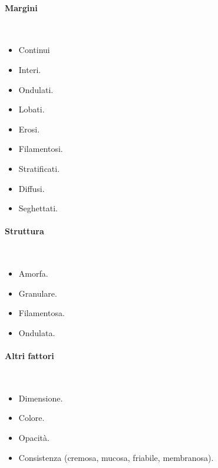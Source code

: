 			\paragraph{Margini}\mbox{}\\
			\begin{multicols}{3}
				\begin{itemize}
					\item Continui
					\item Interi.
					\item Ondulati.
					\item Lobati.
					\item Erosi.
					\item Filamentosi.
					\item Stratificati.
					\item Diffusi.
					\item Seghettati.
				\end{itemize}
			\end{multicols}

			\paragraph{Struttura}\mbox{}\\
			\begin{multicols}{2}
				\begin{itemize}
					\item Amorfa.
					\item Granulare.
					\item Filamentosa.
					\item Ondulata.
				\end{itemize}
			\end{multicols}

			\paragraph{Altri fattori}\mbox{}\\
			\begin{multicols}{3}
				\begin{itemize}
					\item Dimensione.
					\item Colore.
					\item Opacit\`a.
					\item Consistenza (cremosa, mucosa, friabile, membranosa).
				\end{itemize}
			\end{multicols}
	
